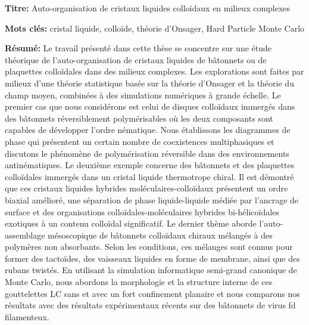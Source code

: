 \documentclass[french,12pt,a4paper]{book}
\begin{document}
\small

\begin{mdframed}[linecolor=Prune,linewidth=1]

\textbf{Titre:} Auto-organisation de cristaux liquides colloïdaux en milieux complexes

\noindent \textbf{Mots clés:} cristal liquide, colloïde, théorie d'Onsager, Hard Particle Monte Carlo

\begin{multicols}{2}
\noindent \textbf{Résumé:} Le travail présenté dans cette thèse se concentre sur une étude théorique de l'auto-organisation de cristaux liquides de bâtonnets ou de plaquettes colloïdales dans des milieux complexes. Les explorations sont faites par milieux d'une théorie statistique basée sur la théorie d'Onsager et la théorie du champ moyen, combinées à des simulations numériques à grande échelle. Le premier cas que nous considérons est celui de disques colloïdaux immergés dans des bâtonnets réversiblement polymérisables où les deux composants sont capables de développer l'ordre nématique. Nous établissons les diagrammes de phase qui présentent un certain nombre de coexistences multiphasiques et discutons le phénomène de polymérisation réversible dans des environnements antinématiques. Le deuxième exemple concerne des bâtonnets et des plaquettes colloïdales immergés dans un cristal liquide thermotrope chiral. Il est démontré que ces cristaux liquides hybrides moléculaires-colloïdaux présentent un ordre biaxial amélioré, une séparation de phase liquide-liquide médiée par l'ancrage de surface et des organisations colloïdales-moléculaires hybrides bi-hélicoïdales exotiques à un contenu colloïdal significatif. Le dernier thème aborde l'auto-assemblage mésoscopique de bâtonnets colloïdaux chiraux mélangés à des polymères non absorbants. Selon les conditions, ces mélanges sont connus pour former des tactoïdes, des vaisseaux liquides en forme de membrane, ainsi que des rubans twistés.  En utilisant la simulation informatique semi-grand canonique de Monte Carlo, nous abordons la morphologie et la structure interne de ces gouttelettes LC sans et avec un fort confinement planaire et nous comparons nos résultats avec des résultats expérimentaux récents sur des bâtonnets de virus fd filamenteux.
\end{multicols}

\end{mdframed}

\vspace{8mm}
\end{document}
